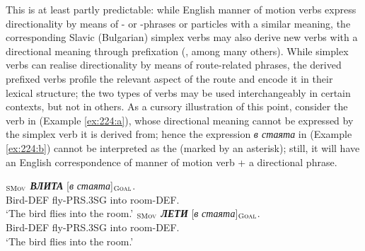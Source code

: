 \documentclass[output=paper,colorlinks,citecolor=brown]{langscibook}
\begin{document}
This is at least partly predictable: while English manner of motion verbs express directionality by means of - or -phrases or particles with a similar meaning, the corresponding Slavic (Bulgarian) simplex verbs may also derive new verbs with a directional meaning through prefixation (\cite{Beavers2010,Lindsey2011,Pantcheva-2007,Pantcheva2007,Pantcheva2011,speed:2015}, among many others). While simplex verbs can realise directionality by means of route-related phrases, the derived prefixed verbs profile the relevant aspect of the route and encode it in their lexical structure; the two types of verbs may be used interchangeably in certain contexts, but not in others. As a cursory illustration of this point, consider the verb in (Example \ref{ex:224:a}), whose directional meaning cannot be expressed by the simplex verb it is derived from; hence the expression \textit{в стаята} in (Example \ref{ex:224:b}) cannot be interpreted as the  (marked by an asterisk); still, it will have an English correspondence of manner of motion verb + a directional phrase. 

\begin{exe}
\ex \label{ex:224}
\begin{xlist}
\ex  \label{ex:224:a}
$_{\text{\textsc{SMov}}}$ \textit{\textbf{ВЛИТА}} [\textit{в} \textit{стаята}]$_{\text{\textsc{Goal}}}$. \\
Bird-DEF fly-PRS.3SG into room-DEF. \\
\glt `The bird flies into the room.'
\ex  \label{ex:224:b}
$_{\text{\textsc{SMov}}}$ \textit{\textbf{ЛЕТИ}} [\textit{в} \textit{стаята}]$_{\text{\textsc{Goal}}}$. \\
Bird-DEF fly-PRS.3SG into room-DEF. \\
\glt `The bird flies into the room.'
\end{xlist}
\end{exe}
\end{document}
